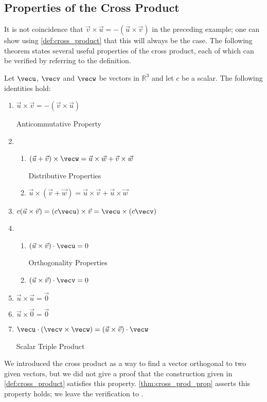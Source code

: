 \subsection{Properties of the Cross Product}

It is not coincidence that $\vec v\times\vec u = -(\vec u\times\vec v)$ in the preceding example; one can show using \autoref{def:cross_product} that this will always be the case. The following theorem states several useful properties of the cross product, each of which can be verified by referring to the definition.

{
\begin{theorem}\label{thm:cross_prod_prop}%
Let $\vecu$, $\vecv$ and $\vecw$ be vectors in $\mathbb{R}^3$ and let $c$ be a scalar. The following identities hold:
\begin{enumerate}
	\item \parbox{167pt}{$\vec u\times\vec v = -(\vec v\times\vec u)$} Anticommutative Property
	\item	\begin{enumerate}
		\item \parbox{145pt}{$(\vec u+\vec v)\times \vecw = \vec u\times\vec w+\vec v\times\vec w$} Distributive Properties
		\item	$\vec u \times (\vec v+\vec w) = \vec u\times\vec v+\vec u\times\vec w$
	\end{enumerate}
	\item		$c(\vec u\times\vec v) = (c\vecu) \times \vec v = \vecu \times (c\vecv)$
	\item		\begin{enumerate}
		\item \parbox{145pt}{$(\vec u\times\vec v)\cdot \vecu = 0$} Orthogonality Properties
		\item	$(\vec u\times\vec v)\cdot \vecv = 0$
	\end{enumerate}
	\item		$\vec u\times\vec u = \vec 0$
	\item		$\vec u\times\vec0 = \vec 0$
	\item		\parbox{167pt}{$\vecu \cdot (\vecv\times\vecw) = (\vec u\times\vec v)\cdot \vecw$} Scalar Triple Product
\end{enumerate}
\end{theorem}
}

We introduced the cross product as a way to find a vector orthogonal to two given vectors, but we did not give a proof that the construction given in \autoref{def:cross_product} satisfies this property. \autoref{thm:cross_prod_prop} asserts this property holds; we leave the verification to .


